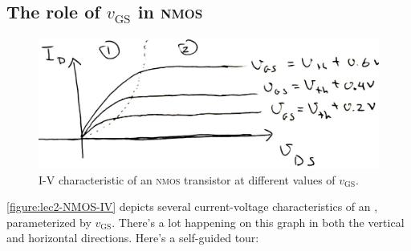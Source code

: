 \subsection{The role of \(v_\text{GS}\) in \textsc{nmos}}
\begin{figure}
  \centering
  \includegraphics[width=0.8\linewidth]{figures/NMOS-IV}
  \caption{I-V characteristic of an \textsc{nmos} transistor at different values of \(v_\text{GS}\).}
  \label{figure:lec2-NMOS-IV}
\end{figure}
\autoref{figure:lec2-NMOS-IV} depicts several current-voltage characteristics of an , parameterized by \(v_\text{GS}\).
There's a lot happening on this graph in both the vertical and horizontal directions.
Here's a self-guided tour:
